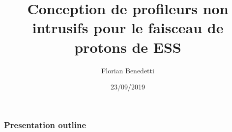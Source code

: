 \documentclass[handout]{beamer}
\title{Conception de profileurs non intrusifs pour le faisceau de protons de ESS}
\author{Florian Benedetti}
\institute{CEA/IRFU}
\date{23/09/2019}
\begin{document}
\frame{\titlepage}

\begin{frame}
  \frametitle{Presentation outline}
  \tableofcontents[hideothersubsections]{}
\end{frame}






\end{document}
